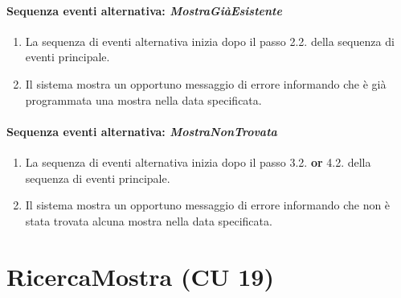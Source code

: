 \documentclass{article}
\begin{document}
	\paragraph{Sequenza eventi alternativa: \textit{MostraGiàEsistente}}
	\begin{enumerate}	[leftmargin=28pt]
			\item  La sequenza di eventi alternativa inizia dopo il passo 2.2. della sequenza di eventi principale.
			\item  Il sistema mostra un opportuno messaggio di errore informando che è già programmata una mostra nella data specificata.
		\end{enumerate}
		
	\paragraph{Sequenza eventi alternativa: \textit{MostraNonTrovata}}
	\begin{enumerate}	[leftmargin=28pt]
			\item  La sequenza di eventi alternativa inizia dopo il passo 3.2. \textbf{or} 4.2. della sequenza di eventi principale.
			\item  Il sistema mostra un opportuno messaggio di errore informando che non è stata trovata alcuna mostra nella data specificata.
		\end{enumerate}
		
	
	
	




	\newpage 

		\section*{RicercaMostra (CU 19)}
	
\end{document}

